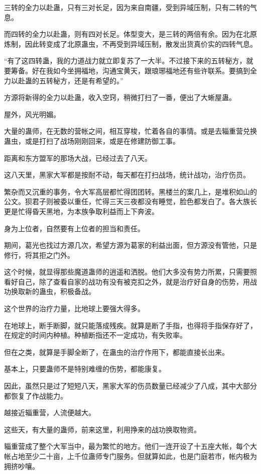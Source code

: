 \begin{this_body}
三转的全力以赴蛊，只有三对长足，因为来自南疆，受到异域压制，只有二转的气息。

而四转的全力以赴蛊，则有四对长足。体型变大，是三转的两倍有余。因为在北原炼制，因此转变成了北原蛊虫，不再受到异域压制，散发出货真价实的四转气息。

“有了这四转蛊，我的力道战力就立即复苏了一大半。不过接下来的五转秘方，就要筹备。好在我如今坐拥福地，沟通宝黄天，跟琅琊福地还有些许联系。要搞到全力以赴蛊的五转秘方，还是有希望的。”

方源将新得的全力以赴蛊，收入空窍，稍微打扫了一番，便出了大蜥屋蛊。

屋外，风光明媚。

大量的蛊师，在无数的营帐之间，相互穿梭，忙着各自的事情。或是去辎重营兑换蛊虫，或是打扫了战场刚刚回来，或是在修建防御工事。

距离和东方盟军的那场大战，已经过去了八天。

这八天里，黑家大军都是按耐不动，每天都在打扫战场，统计战功，治疗伤员。

繁杂而又沉重的事务，令大军高层都忙得团团转。黑楼兰的案几上，是堆积如山的公文。狈君子则被委以重任，忙得三天三夜都没有睡觉，脸色都发白了。各大族长更是忙得昏天黑地，为本族争取利益而上下奔波。

身为上位者，自然要有上位者的担当和责任。

期间，葛光也找过方源几次，希望方源为葛家的利益出面，但方源没有管他，只是修行，将其拒之门外。

这个时候，就显得那些魔道蛊师的逍遥和洒脱。他们大多没有势力所累，只需要照看好自己，除了查看自家的战功有没有被克扣之外，就是治疗好自身的伤势，用战功换取新的蛊虫，积极备战。

这个世界的治疗力量，比地球上要强大得多。

在地球上，断手断脚，就只能落成残疾。就算是断了手指，也得将手指保存好了，在规定的时间内种植。种植断指还不一定成功，有失败率。

但在之类，就算是手脚全断了，在蛊虫的治疗作用下，都能直接长出来。

基本上，只要蛊师不是特别难缠的伤势，都能康复。

因此，虽然只是过了短短八天，黑家大军的伤员数量已经减少了八成，其中大部分都恢复了作战能力。

越接近辎重营，人流便越大。

这些天，有大量的蛊师，前来这里，利用挣来的战功换取物资。

辎重营成了整个大军当中，最为繁忙的地方。他们一连开设了十五座大帐，每个大帐占地至少二十亩，上千位蛊师专门服务。但就算如此，也是门庭若市，帐内极为拥挤吵嚷。


\end{this_body}
